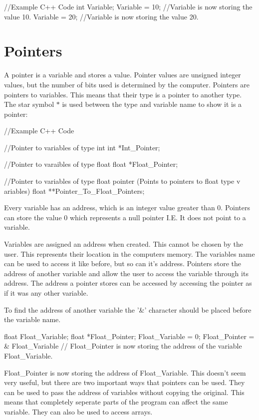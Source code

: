 \begin{DoxyCode}
 //Example C++ Code
 int Variable;
 Variable = 10;
 //Variable is now storing the value 10.
 Variable = 20;
 //Variable is now storing the value 20.
\end{DoxyCode}
\hypertarget{_programming_basics_BasicsPagePointers}{}\section{Pointers}\label{_programming_basics_BasicsPagePointers}
A pointer is a variable and stores a value. Pointer values are unsigned integer values, but the number of bits used is determined by the computer. Pointers are pointers to variables. This means that their type is a pointer to another type. The star symbol {\bfseries $\ast$} is used between the type and variable name to show it is a pointer: 
\begin{DoxyCode}
  //Example C++ Code

 //Pointer to variables of type int
 int *Int_Pointer;

 //Pointer to varaibles of type float
 float *Float_Pointer;

 //Pointer to variables of type float pointer (Points to pointers to float type v
      ariables)
 float **Pointer_To_Float_Pointers;
\end{DoxyCode}
 Every variable has an address, which is an integer value greater than 0. Pointers can store the value 0 which represents a null pointer I.E. It does not point to a variable. \par
 Variables are assigned an address when created. This cannot be chosen by the user. This represents their location in the computers memory. The variables name can be used to access it like before, but so can it's address. Pointers store the address of another variable and allow the user to access the variable through its address. The address a pointer stores can be accessed by accessing the pointer as if it was any other variable. \par
 To find the address of another variable the '\&' character should be placed before the variable name. 
\begin{DoxyCode}
 float Float_Variable;
 float *Float_Pointer;
 Float_Variable = 0;
 Float_Pointer = & Float_Variable
 // Float_Pointer is now storing the address of the variable Float_Variable.
\end{DoxyCode}
 Float\_\-Pointer is now storing the address of Float\_\-Variable. This doesn't seem very useful, but there are two important ways that pointers can be used. They can be used to pass the address of variables without copying the original. This means that completely seperate parts of the program can affect the same variable. They can also be used to access arrays. \par
